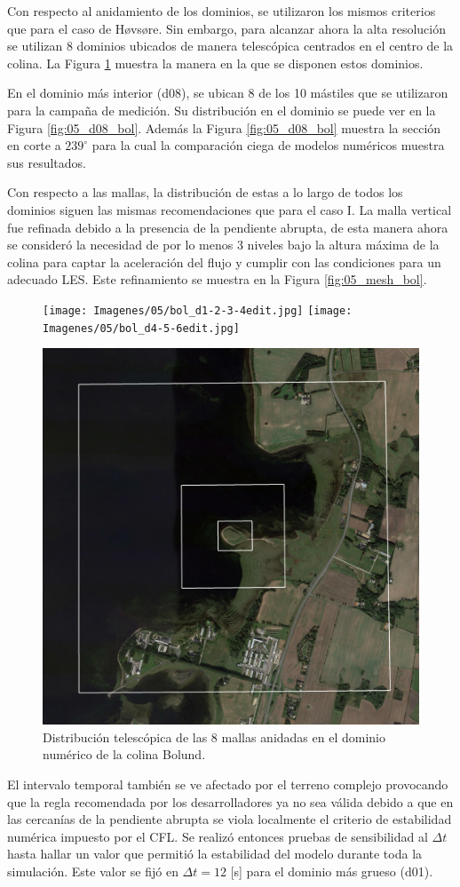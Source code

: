 Con respecto al anidamiento de los dominios, se utilizaron los mismos criterios que para el caso de Høvsøre. Sin embargo, para alcanzar ahora la alta resolución se utilizan 8 dominios ubicados de manera telescópica centrados en el centro de la colina. La Figura \ref{fig:05_dom_bol} muestra la manera en la que se disponen estos dominios.

En el dominio más interior (d08), se ubican 8 de los 10 mástiles que se utilizaron para la campaña de medición. Su distribución en el dominio se puede ver en la Figura \ref{fig:05_d08_bol}. Además la Figura \ref{fig:05_d08_bol} muestra la sección en corte a $239^\circ$ para la cual la comparación ciega de modelos numéricos muestra sus resultados.

Con respecto a las mallas, la distribución de estas a lo largo de todos los dominios siguen las mismas recomendaciones que para el caso I. La malla vertical fue refinada debido a la presencia de la pendiente abrupta, de esta manera ahora se consideró la necesidad de por lo menos 3 niveles bajo la altura máxima de la colina para captar la aceleración del flujo y cumplir con las condiciones para un adecuado LES. Este refinamiento se muestra en la Figura \ref{fig:05_mesh_bol}.

\begin{figure}[H]
	\centering
	\texttt{[image: Imagenes/05/bol\_d1-2-3-4edit.jpg]}
	\texttt{[image: Imagenes/05/bol\_d4-5-6edit.jpg]}
	
	\bigskip
	\includegraphics[width=0.48\linewidth,page=1,trim={5mm 3mm 3mm 3mm},clip,frame]{Imagenes/05/bol_d6-7-8edit.jpg}%
	
	\caption{Distribución telescópica de las 8 mallas anidadas en el dominio numérico de la colina Bolund.}
	\label{fig:05_dom_bol}
\end{figure}

El intervalo temporal también se ve afectado por el terreno complejo provocando que la regla recomendada por los desarrolladores ya no sea válida debido a que en las cercanías de la pendiente abrupta se viola localmente el criterio de estabilidad numérica impuesto por el CFL. Se realizó entonces pruebas de sensibilidad al $\Delta t$ hasta hallar un valor que permitió la estabilidad del modelo durante toda la simulación. Este valor se fijó en $\Delta t = 12$ [s] para el dominio más grueso (d01).

